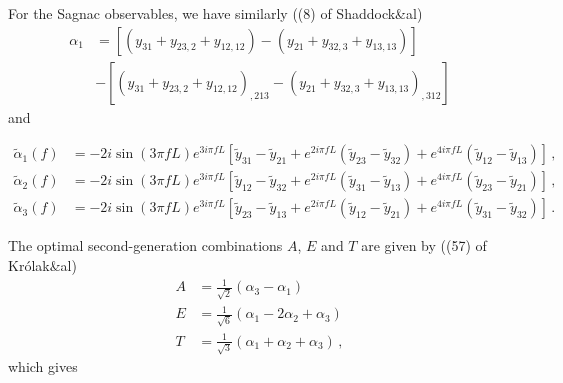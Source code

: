 \documentclass[aps,showpacs,%
prd,superscriptaddress,nofootinbib]{revtex4}
\newcommand{\nn}{\nonumber}
\begin{document}
For the Sagnac observables, we have similarly ((8) of Shaddock\&al)
%
\begin{align}
	\alpha_{1} &= \left[ \left( y_{31} + y_{23,2} + y_{12,12} \right) - \left( y_{21} + y_{32,3} + y_{13,13} \right) \right] \nn\\
	& - \left[ \left( y_{31} + y_{23,2} + y_{12,12} \right)_{,213} - \left( y_{21} + y_{32,3} + y_{13,13} \right)_{,312} \right]
\end{align}
%
and
%
\begin{widetext}
\begin{align}
	\tilde{\alpha}_{1}(f) &= - 2i \sin\left(3\pi f L\right) e^{3 i \pi f L} \left[ \tilde{y}_{31} - \tilde{y}_{21} + e^{2i\pi f L} \left( \tilde{y}_{23} - \tilde{y}_{32} \right) + e^{4i\pi f L} \left( \tilde{y}_{12} - \tilde{y}_{13} \right) \right] \,, \nn\\
	\tilde{\alpha}_{2}(f) &= - 2i \sin\left(3\pi f L\right) e^{3 i \pi f L} \left[ \tilde{y}_{12} - \tilde{y}_{32} + e^{2i\pi f L} \left( \tilde{y}_{31} - \tilde{y}_{13} \right) + e^{4i\pi f L} \left( \tilde{y}_{23} - \tilde{y}_{21} \right) \right] \,, \nn\\
	\tilde{\alpha}_{3}(f) &= - 2i \sin\left(3\pi f L\right) e^{3 i \pi f L} \left[ \tilde{y}_{23} - \tilde{y}_{13} + e^{2i\pi f L} \left( \tilde{y}_{12} - \tilde{y}_{21} \right) + e^{4i\pi f L} \left( \tilde{y}_{31} - \tilde{y}_{32} \right) \right] \,.
\end{align}
\end{widetext}
%
The optimal second-generation combinations $A$, $E$ and $T$ are given by ((57) of Kr\'olak\&al)
%
\begin{align}
	A &= \frac{1}{\sqrt{2}} \left( \alpha_{3} - \alpha_{1} \right) \nn\\
	E &= \frac{1}{\sqrt{6}} \left( \alpha_{1} - 2\alpha_{2} + \alpha_{3} \right) \nn\\
	T &= \frac{1}{\sqrt{3}} \left( \alpha_{1} + \alpha_{2} + \alpha_{3} \right) \,,
\end{align}
%
which gives
%
\end{document}
